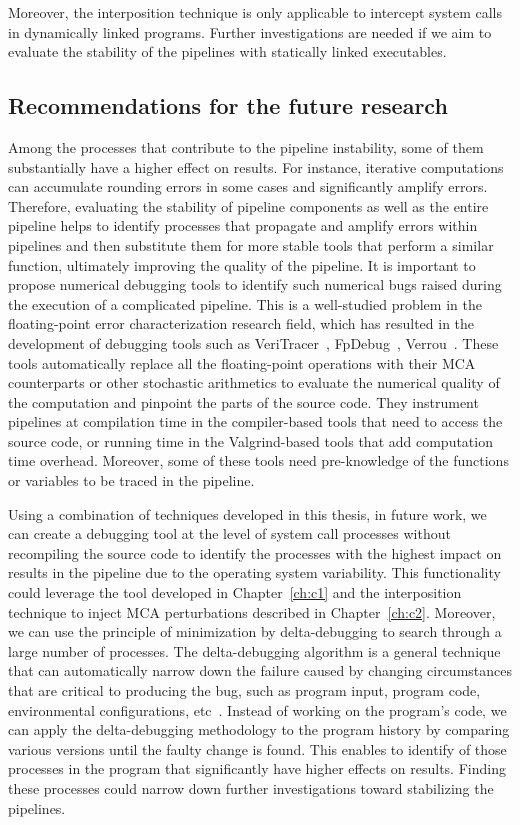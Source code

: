 Moreover, the interposition technique is only applicable to intercept system calls in dynamically linked programs. 
Further investigations are needed if we aim to evaluate the stability of the pipelines with statically linked executables.


\subsection{Recommendations for the future research}

Among the processes that contribute to the pipeline instability, some of them substantially
have a higher effect on results. For instance, iterative computations can accumulate rounding errors in
some cases and significantly amplify errors. Therefore, evaluating the stability of pipeline components as
well as the entire pipeline helps to identify processes that propagate and amplify errors within pipelines and
then substitute them for more stable tools that perform a similar function, ultimately improving the quality
of the pipeline.
It is important to propose numerical debugging tools to identify such numerical bugs raised during the
execution of a complicated pipeline. This is a well-studied problem in the floating-point error characterization
research field, which has resulted in the development of debugging tools such as VeriTracer~\cite{chatelain2018veritracer},
FpDebug~\cite{benz2012dynamic}, Verrou~\cite{fevotte2019debugging}.
These tools automatically replace all the floating-point operations with their MCA counterparts
or other stochastic arithmetics to evaluate the numerical quality of the computation and pinpoint the parts
of the source code. They instrument pipelines at compilation time in the compiler-based tools that need to
access the source code, or running time in the Valgrind-based tools that add computation time overhead.
Moreover, some of these tools need pre-knowledge of the functions or variables to be traced in the pipeline.

Using a combination of techniques developed in this thesis, in future work,
we can create a debugging tool at the level of system call processes without
recompiling the source code to identify the processes with the highest impact on results in the pipeline due
to the operating system variability. 
This functionality could leverage the tool
developed in Chapter~\ref{ch:c1} and the interposition technique to inject MCA perturbations described in Chapter~\ref{ch:c2}.
Moreover, we can use the principle of minimization by delta-debugging to search through a large number of processes. 
The delta-debugging algorithm is a general technique that can automatically narrow down the failure caused by changing circumstances
that are critical to producing the bug, such as program input, program code, environmental configurations,
etc~\cite{zeller1999yesterday,zeller2002isolating}. Instead of working on the program's code, we can apply the delta-debugging methodology to the
program history by comparing various versions until the faulty change is found. This enables to identify
of those processes in the program that significantly have higher effects on results. Finding these processes could
narrow down further investigations toward stabilizing the pipelines.

